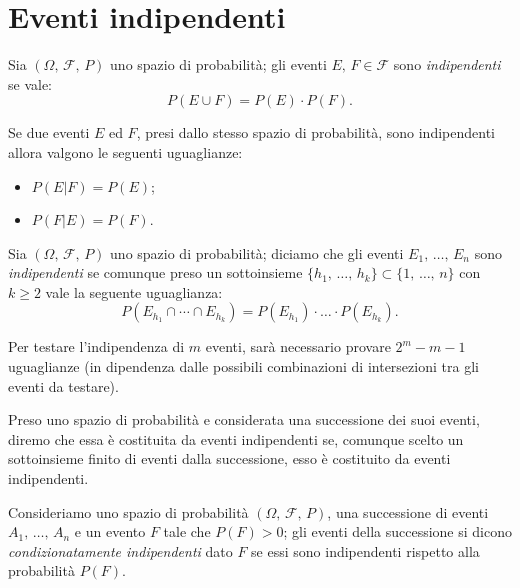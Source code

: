     \section{Eventi indipendenti}
        \begin{defn}\label{defn:Eventi_indipendenti}
            Sia $(\Omega,\,\mathscr{F},\,P)$ uno spazio di probabilità; gli eventi $E,\,F \in \mathscr{F}$ sono \textit{indipendenti} se vale: \[
                P(E \cup F) = P(E) \cdot P(F)
            .\] 
        \end{defn}
        \begin{obsv}
            Se due eventi $E$ ed $F$, presi dallo stesso spazio di probabilità, sono indipendenti allora valgono le seguenti uguaglianze:
            \begin{itemize}
                \item $P(E|F) = P(E)$;
                \item $P(F|E) = P(F)$.
            \end{itemize}
        \end{obsv}
        \begin{defn}
            Sia $(\Omega,\,\mathscr{F},\,P)$ uno spazio di probabilità; diciamo che gli eventi $E_1,\, \ldots,\, E_n$ sono \textit{indipendenti} se comunque preso un sottoinsieme $\{h_1,\, \ldots,\, h_k\} \subset \{1,\, \ldots,\, n\}$ con $k \geq 2$ vale la seguente uguaglianza: \[
                P(E_{h_1} \cap \dotsm \cap E_{h_k}) = P(E_{h_1}) \cdot \ldots \cdot P(E_{h_k})
            .\] 
        \end{defn}
        \begin{obsv}
            Per testare l'indipendenza di $m$ eventi, sarà necessario provare $2^{m} - m - 1$ uguaglianze (in dipendenza dalle possibili combinazioni di intersezioni tra gli eventi da testare).
        \end{obsv}
        \begin{defn}
            Preso uno spazio di probabilità e considerata una successione dei suoi eventi, diremo che essa è costituita da eventi indipendenti se, comunque scelto un sottoinsieme finito di eventi dalla successione, esso è costituito da eventi indipendenti.
        \end{defn}
        \begin{defn}
            Consideriamo uno spazio di probabilità $(\Omega,\,\mathscr{F},\,P)$, una successione di eventi $A_1,\, \ldots,\, A_n$ e un evento $F$ tale che $P(F) > 0$; gli eventi della successione si dicono \textit{condizionatamente indipendenti} dato $F$ se essi sono indipendenti rispetto alla probabilità $P(F)$.
        \end{defn}
